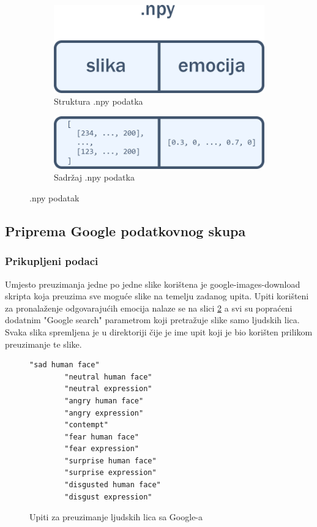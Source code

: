 \documentclass[times, utf8, zavrsni,numeric,pstricks]{fer}
\begin{document}
\begin{figure}[H]
	\centering
	\begin{subfigure}[b]{0.4\linewidth}
	  	\centering
		\includegraphics[width=\linewidth, keepaspectratio]{numpy_slika_emocija.png}
		\caption{Struktura .npy podatka}		
	\end{subfigure}
	\begin{subfigure}[b]{0.4\linewidth}
	  	\centering
		\includegraphics[width=\linewidth, keepaspectratio]{numpy_imgdata_emo.png}
		\caption{Sadržaj .npy podatka}
	\end{subfigure}	
	\caption{.npy podatak}	
	\label{fig:npy_array}
\end{figure}


\subsection{Priprema Google podatkovnog skupa}\label{priprema_google}
\subsubsection{Prikupljeni podaci}
Umjesto preuzimanja jedne po jedne slike korištena je google-images-download skripta \cite{google-images-download} koja preuzima sve moguće slike na temelju zadanog upita. Upiti korišteni za pronalaženje odgovarajućih emocija nalaze se na slici \ref{cb:google_queries} a svi su popraćeni dodatnim "Google search" parametrom koji pretražuje slike samo ljudskih lica. Svaka slika spremljena je u direktoriji čije je ime upit koji je bio korišten prilikom preuzimanje te slike. 

\begin{figure}[H]
	\centering
		\begin{Verbatim}[fontsize=\small]
		"sad human face"
		"neutral human face"
		"neutral expression"
		"angry human face"
		"angry expression"
		"contempt"
		"fear human face"
		"fear expression"
		"surprise human face"
		"surprise expression"
		"disgusted human face"
		"disgust expression"
		\end{Verbatim}
	\caption{Upiti za preuzimanje ljudskih lica sa Google-a}
	\label{cb:google_queries}
\end{figure}
\end{document}
